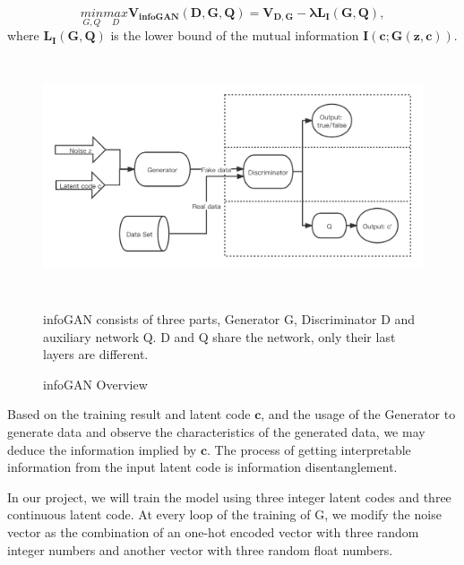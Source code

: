 \[\underset{G,Q}{min}\underset{D}{max} \mathbf{V_{infoGAN}(D, G, Q)} = \mathbf{V_{D, G} - \lambda \mathbf{L_I(G,Q)}},\] where \(\mathbf{L_I(G,Q)}\) is the lower bound of the mutual information \(\mathbf{I(c;G(z,c))}\).
\begin{figure}[h]
  \centering
  \includegraphics[width=\textwidth, height = 7cm]{figures/infoGAN.png}
  \caption{infoGAN Overview}{infoGAN consists of three parts, Generator G, Discriminator D and auxiliary network Q. D and Q share the network, only their last layers are different.}
  \label{infoGan}
\end{figure}

Based on the training result and latent code \(\mathbf{c}\), and the usage of the Generator to generate data and observe the characteristics of the generated data, we may deduce the information implied by \(\mathbf{c}\). The process of getting interpretable information from the input latent code is information disentanglement.

In our project, we will train the model using three integer latent codes and three continuous latent code. At every loop of the training of G, we modify the noise vector as the combination of an one-hot encoded vector with three random integer numbers and another vector with three random float numbers.

